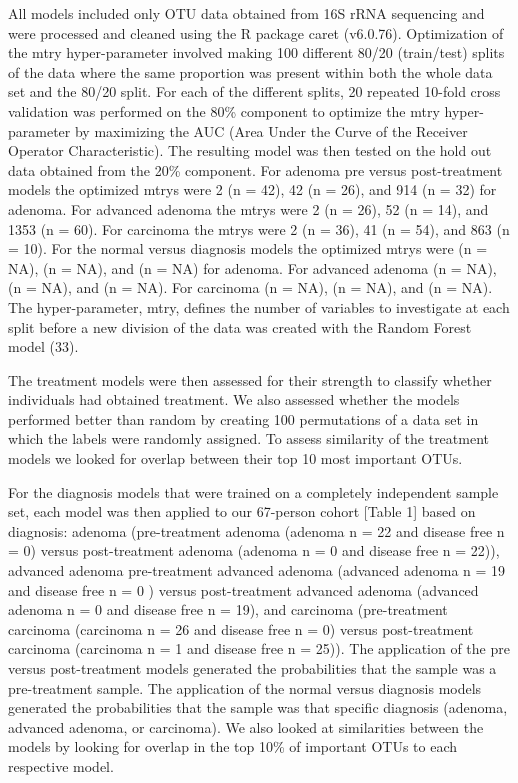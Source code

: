 \documentclass[12pt,]{article}
\begin{document}
All models included only OTU data obtained from 16S rRNA sequencing and
were processed and cleaned using the R package caret (v6.0.76).
Optimization of the mtry hyper-parameter involved making 100 different
80/20 (train/test) splits of the data where the same proportion was
present within both the whole data set and the 80/20 split. For each of
the different splits, 20 repeated 10-fold cross validation was performed
on the 80\% component to optimize the mtry hyper-parameter by maximizing
the AUC (Area Under the Curve of the Receiver Operator Characteristic).
The resulting model was then tested on the hold out data obtained from
the 20\% component. For adenoma pre versus post-treatment models the
optimized mtrys were 2 (n = 42), 42 (n = 26), and 914 (n = 32) for
adenoma. For advanced adenoma the mtrys were 2 (n = 26), 52 (n = 14),
and 1353 (n = 60). For carcinoma the mtrys were 2 (n = 36), 41 (n = 54),
and 863 (n = 10). For the normal versus diagnosis models the optimized
mtrys were (n = NA), (n = NA), and (n = NA) for adenoma. For advanced
adenoma (n = NA), (n = NA), and (n = NA). For carcinoma (n = NA), (n =
NA), and (n = NA). The hyper-parameter, mtry, defines the number of
variables to investigate at each split before a new division of the data
was created with the Random Forest model (33).

The treatment models were then assessed for their strength to classify
whether individuals had obtained treatment. We also assessed whether the
models performed better than random by creating 100 permutations of a
data set in which the labels were randomly assigned. To assess
similarity of the treatment models we looked for overlap between their
top 10 most important OTUs.

For the diagnosis models that were trained on a completely independent
sample set, each model was then applied to our 67-person cohort {[}Table
1{]} based on diagnosis: adenoma (pre-treatment adenoma (adenoma n = 22
and disease free n = 0) versus post-treatment adenoma (adenoma n = 0 and
disease free n = 22)), advanced adenoma pre-treatment advanced adenoma
(advanced adenoma n = 19 and disease free n = 0 ) versus post-treatment
advanced adenoma (advanced adenoma n = 0 and disease free n = 19), and
carcinoma (pre-treatment carcinoma (carcinoma n = 26 and disease free n
= 0) versus post-treatment carcinoma (carcinoma n = 1 and disease free n
= 25)). The application of the pre versus post-treatment models
generated the probabilities that the sample was a pre-treatment sample.
The application of the normal versus diagnosis models generated the
probabilities that the sample was that specific diagnosis (adenoma,
advanced adenoma, or carcinoma). We also looked at similarities between
the models by looking for overlap in the top 10\% of important OTUs to
each respective model.
\end{document}
